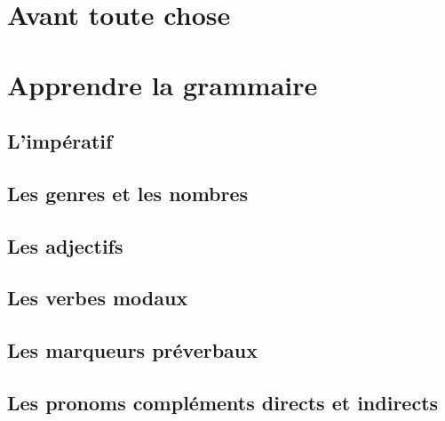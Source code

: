 \documentclass[draft]{book}
\begin{document}




\tableofcontents

\part{Avant toute chose}



\part{Apprendre la grammaire}
















\chapter{L'impératif}

\chapter{Les genres et les nombres}

\chapter{Les adjectifs}



\chapter{Les verbes modaux}\label{VerbMod}

\chapter{Les marqueurs préverbaux}\label{MarqPVer}

\chapter{Les pronoms compléments directs et indirects} \label{PronCompl}
\end{document}
